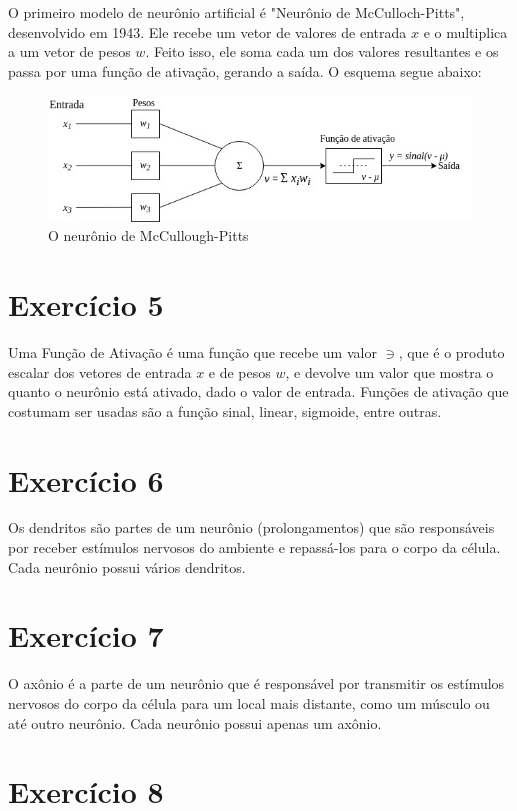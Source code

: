 \documentclass[a4]{article}
\begin{document}
O primeiro modelo de neurônio artificial é "Neurônio de McCulloch-Pitts", desenvolvido em 1943. Ele recebe um vetor de valores de entrada $ x $ e o multiplica a um vetor de pesos $ w $. Feito isso, ele soma cada um dos valores resultantes e os passa por uma função de ativação, gerando a saída. O esquema segue abaixo:

\begin{figure}[H]
	\centering
	\includegraphics[width=0.8\linewidth]{neuronio.jpg}
	\caption{O neurônio de McCullough-Pitts}
\end{figure}

\section*{Exercício 5}

Uma Função de Ativação é uma função que recebe um valor $ \ni $, que é o produto escalar dos vetores de entrada $ x $ e de pesos $ w $, e devolve um valor que mostra o quanto o neurônio está ativado, dado o valor de entrada. Funções de ativação que costumam ser usadas são a função sinal, linear, sigmoide, entre outras.
 
\section*{Exercício 6}

Os dendritos são partes de um neurônio (prolongamentos) que são responsáveis por receber estímulos nervosos do ambiente e repassá-los para o corpo da célula. Cada neurônio possui vários dendritos. 

\section*{Exercício 7}

O axônio é a parte de um neurônio que é responsável por transmitir os estímulos nervosos do corpo da célula para um local mais distante, como um músculo ou até outro neurônio. Cada neurônio possui apenas um axônio.

\section*{Exercício 8}
\end{document}
